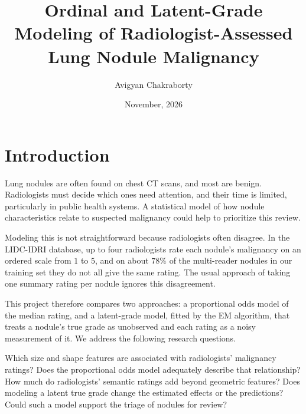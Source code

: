 \documentclass[12pt]{article}
\title{Ordinal and Latent-Grade Modeling of Radiologist-Assessed
Lung Nodule Malignancy}
\author{Avigyan Chakraborty}
\date{November, 2026}
\begin{document}

\makecontents

\section{Introduction}

Lung nodules are often found on chest CT scans, and most are benign. Radiologists
must decide which ones need attention, and their time is limited, particularly in
public health systems. A statistical model of how nodule characteristics relate to
suspected malignancy could help to prioritize this review.

Modeling this is not straightforward because radiologists often disagree. In the
LIDC-IDRI database, up to four radiologists rate each nodule's malignancy on an
ordered scale from $1$ to $5$, and on about $78\%$ of the multi-reader nodules in
our training set they do not all give the same rating. The usual approach of
taking one summary rating per nodule ignores this disagreement.

This project therefore compares two approaches: a proportional odds model of the
median rating, and a latent-grade model, fitted by the EM algorithm, that treats a
nodule's true grade as unobserved and each rating as a noisy measurement of it. We
address the following research questions.
\begin{enumerate}
    \ii Which size and shape features are associated with radiologists' malignancy
    ratings?
    \ii Does the proportional odds model adequately describe that relationship?
    \ii How much do radiologists' semantic ratings add beyond geometric features?
    \ii Does modeling a latent true grade change the estimated effects or the
    predictions?
    \ii Could such a model support the triage of nodules for review?
\end{enumerate}
\end{document}
